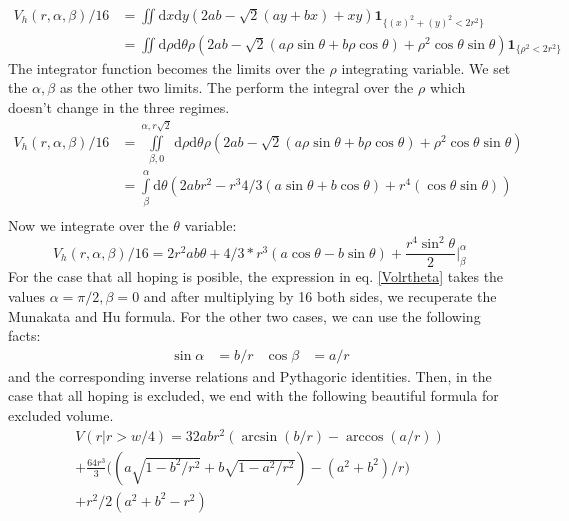 \documentclass[letterpaper,10pt, jcp, aps]{revtex4-1}
\newcommand{\rd}{\!\mathrm{d}}
\newcommand{\indicator}[1]{\mathbf{1}_{ \{   #1 \} } }
\begin{document}
\begin{equation}\label{Vhatch1}
\begin{split}
V_h(r,\alpha,\beta)/16 &=\iint \rd x \rd y (2ab-\sqrt{2}(ay+bx)+x y)
\indicator{(x)^2+(y)^2<2r^2 }\\
&=\iint \rd \rho \rd \theta \rho (2ab
-\sqrt{2}(a\rho\sin\theta+b\rho\cos\theta)
+\rho^2 \cos\theta\sin\theta)
\indicator{\rho^2<2r^2 }
\end{split}
\end{equation}
The integrator function becomes the limits over the $\rho$ integrating variable.
We set the $\alpha, \beta$ as the other two limits. The perform the
integral over the $\rho$ which doesn't change in the three regimes.
\begin{equation}
  \begin{split}
 V_h(r,\alpha,\beta)/16 &=\iint\limits_{\beta,0}^{\alpha,r\sqrt{2}} \rd \rho \rd \theta \rho (2ab
-\sqrt{2}(a\rho\sin\theta+b\rho\cos\theta)
+\rho^2 \cos\theta\sin\theta)\\
 &=\int\limits_\beta^{\alpha}  \rd \theta  
(2abr^2 - r^3 4/3 (a\sin\theta+b\cos\theta)+r^4 (\cos\theta\sin\theta))\\
\end{split}
  \end{equation}
Now we integrate over the $\theta$ variable:
\begin{equation}\label{Volrtheta}
  V_h(r,\alpha,\beta)/16 = 2r^2ab\theta+4/3*r^3(a\cos\theta-b\sin\theta)
  +\frac{r^4 \sin^2\theta}{2} \Bigg\vert_\beta^\alpha
\end{equation}
For the case that all hoping is posible, the expression in eq. \ref{Volrtheta}
takes the values $\alpha=\pi/2, \beta=0$ and after multiplying by 16 both sides,
we recuperate the Munakata and Hu formula. For the other two cases, we can use the following
facts:
\begin{align}
  \sin\alpha&=b/r & \cos\beta&=a/r 
\end{align}
and the corresponding inverse relations and Pythagoric identities.
Then, in the case that all hoping is excluded, we end with the following beautiful
formula for excluded volume.
\begin{multline}\label{VolCaso3}
  V(r \vert r>w/4 )=32abr^2(\arcsin(b/r)-\arccos(a/r))\\
  +\frac{64r^3}{3}\biggl((a\sqrt{1-b^2/r^2}+b\sqrt{1-a^2/r^2})-(a^2+b^2)/r\biggr)\\
  +r^2/2(a^2+b^2-r^2)
\end{multline}
\end{document}
